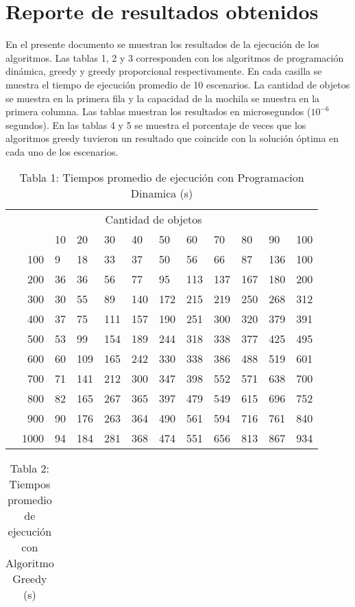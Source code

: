 \documentclass{article}
\begin{document}
\section*{Reporte de resultados obtenidos}
En el presente documento se muestran los resultados de la ejecución de los algoritmos. Las tablas 1, 2 y 3 corresponden con los algoritmos de programación dinámica, greedy y greedy proporcional respectivamente. En cada casilla se muestra el tiempo de ejecución promedio de 10 escenarios. La cantidad de objetos se muestra en la primera fila y la capacidad de la mochila se muestra en la primera columna. Las tablas muestran los resultados en microsegundos ($10^{-6}$ segundos).
En las tablas 4 y 5 se muestra el porcentaje de veces que los algoritmos greedy tuvieron un resultado que coincide con la solución óptima en cada uno de los escenarios.
\begin{center}
\begin{table}[ht]
\centering
\caption*{Tabla 1: Tiempos promedio de ejecución con Programacion Dinamica (\textmu s)}
\label{1}
\begin{tabularx}{0.8\textwidth}{Xr|XXXXXXXXXX}
&\multicolumn{10}{c}{Cantidad de objetos} \\
&&10&20&30&40&50&60&70&80&90&100\\\hline
\parbox[t]{2mm}{}&100&9&18&33&37&50&56&66&87&136&100\\
&200&36&36&56&77&95&113&137&167&180&200\\
&300&30&55&89&140&172&215&219&250&268&312\\
&400&37&75&111&157&190&251&300&320&379&391\\
&500&53&99&154&189&244&318&338&377&425&495\\
&600&60&109&165&242&330&338&386&488&519&601\\
&700&71&141&212&300&347&398&552&571&638&700\\
&800&82&165&267&365&397&479&549&615&696&752\\
&900&90&176&263&364&490&561&594&716&761&840\\
&1000&94&184&281&368&474&551&656&813&867&934\\
\end{tabularx}
\end{table}
\begin{table}[ht]
\centering
\caption*{Tabla 2: Tiempos promedio de ejecución con Algoritmo Greedy (\textmu s)}
\label{2}
\begin{tabularx}{0.8\textwidth}{Xr|XXXXXXXXXX}

\end{tabularx}
\end{table}
\end{center}
\end{document}
